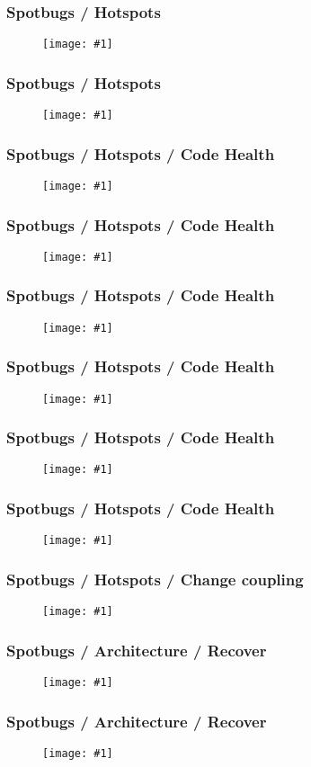 \documentclass{beamer}
\newcommand{\putimage}[2] {
\begin{figure}[H]
  \centering
  \texttt{[image: \#1]}
\end{figure}
}
\begin{document}
\begin{frame}
  \frametitle{Spotbugs / Hotspots}
  \putimage{img/spotbugs-hotspots-4.png}{0.99}
\end{frame}

\begin{frame}
  \frametitle{Spotbugs / Hotspots}
  \putimage{img/spotbugs-hotspots-5.png}{0.99}
\end{frame}

\begin{frame}
  \frametitle{Spotbugs / Hotspots / Code Health}
  \putimage{img/spotbugs-hotspot-codehealth-1.png}{0.99}
\end{frame}

\begin{frame}
  \frametitle{Spotbugs / Hotspots / Code Health}
  \putimage{img/spotbugs-hotspot-codehealth-2.png}{0.99}
\end{frame}

\begin{frame}
  \frametitle{Spotbugs / Hotspots / Code Health}
  \putimage{img/spotbugs-hotspot-codehealth-3.png}{0.99}
\end{frame}

\begin{frame}
  \frametitle{Spotbugs / Hotspots / Code Health}
  \putimage{img/spotbugs-hotspot-codehealth-4.png}{0.99}
\end{frame}

\begin{frame}
  \frametitle{Spotbugs / Hotspots / Code Health}
  \putimage{img/spotbugs-hotspot-codehealth-5.png}{0.99}
\end{frame}

\begin{frame}
  \frametitle{Spotbugs / Hotspots / Code Health}
  \putimage{img/spotbugs-hotspot-codehealth-6.png}{0.99}
\end{frame}

\begin{frame}
  \frametitle{Spotbugs / Hotspots / Change coupling}
  \putimage{img/spotbugs-hotspot-change-coupling-1.png}{0.99}
\end{frame}

\begin{frame}
  \frametitle{Spotbugs / Architecture / Recover}
  \putimage{img/spotbugs-architecture-1.png}{0.99}
\end{frame}

\begin{frame}
  \frametitle{Spotbugs / Architecture / Recover}
  \putimage{img/spotbugs-architecture-2.png}{0.99}
\end{frame}
\end{document}
